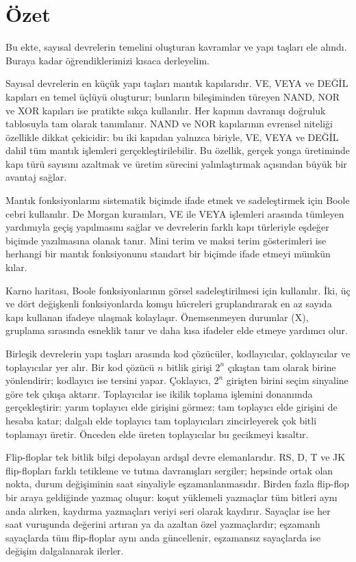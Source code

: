 \section*{Özet}

Bu ekte, sayısal devrelerin temelini oluşturan kavramlar ve yapı taşları ele alındı. Buraya kadar öğrendiklerimizi kısaca derleyelim.

Sayısal devrelerin en küçük yapı taşları mantık kapılarıdır. VE, VEYA ve DEĞİL kapıları en temel üçlüyü oluşturur; bunların bileşiminden türeyen NAND, NOR ve XOR kapıları ise pratikte sıkça kullanılır. Her kapının davranışı doğruluk tablosuyla tam olarak tanımlanır. NAND ve NOR kapılarının evrensel niteliği özellikle dikkat çekicidir: bu iki kapıdan yalnızca biriyle, VE, VEYA ve DEĞİL dahil tüm mantık işlemleri gerçekleştirilebilir. Bu özellik, gerçek yonga üretiminde kapı türü sayısını azaltmak ve üretim sürecini yalınlaştırmak açısından büyük bir avantaj sağlar.

Mantık fonksiyonlarını sistematik biçimde ifade etmek ve sadeleştirmek için Boole cebri kullanılır. De Morgan kuramları, VE ile VEYA işlemleri arasında tümleyen yardımıyla geçiş yapılmasını sağlar ve devrelerin farklı kapı türleriyle eşdeğer biçimde yazılmasına olanak tanır. Mini terim ve maksi terim gösterimleri ise herhangi bir mantık fonksiyonunu standart bir biçimde ifade etmeyi mümkün kılar.

Karno haritası, Boole fonksiyonlarının görsel sadeleştirilmesi için kullanılır. İki, üç ve dört değişkenli fonksiyonlarda komşu hücreleri gruplandırarak en az sayıda kapı kullanan ifadeye ulaşmak kolaylaşır. Önemsenmeyen durumlar (X), gruplama sırasında esneklik tanır ve daha kısa ifadeler elde etmeye yardımcı olur.

Birleşik devrelerin yapı taşları arasında kod çözücüler, kodlayıcılar, çoklayıcılar ve toplayıcılar yer alır. Bir kod çözücü $n$ bitlik girişi $2^n$ çıkıştan tam olarak birine yönlendirir; kodlayıcı ise tersini yapar. Çoklayıcı, $2^n$ girişten birini seçim sinyaline göre tek çıkışa aktarır. Toplayıcılar ise ikilik toplama işlemini donanımda gerçekleştirir: yarım toplayıcı elde girişini görmez; tam toplayıcı elde girişini de hesaba katar; dalgalı elde toplayıcı tam toplayıcıları zincirleyerek çok bitli toplamayı üretir. Önceden elde üreten toplayıcılar bu gecikmeyi kısaltır.

Flip-floplar tek bitlik bilgi depolayan ardışıl devre elemanlarıdır. RS, D, T ve JK flip-flopları farklı tetikleme ve tutma davranışları sergiler; hepsinde ortak olan nokta, durum değişiminin saat sinyaliyle eşzamanlanmasıdır. Birden fazla flip-flop bir araya geldiğinde yazmaç oluşur: koşut yüklemeli yazmaçlar tüm bitleri aynı anda alırken, kaydırma yazmaçları veriyi seri olarak kaydırır. Sayaçlar ise her saat vuruşunda değerini artıran ya da azaltan özel yazmaçlardır; eşzamanlı sayaçlarda tüm flip-floplar aynı anda güncellenir, eşzamansız sayaçlarda ise değişim dalgalanarak ilerler.

